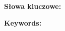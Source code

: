 {  \pracaStreszczenie\par
  \vspace{3mm}
  \noindent\textbf{Słowa kluczowe:} \pracaSlowaKluczowe\par
  \vspace{10mm}
  \begin{otherlanguage}{english}
  \vspace{2mm}
  \pracaAbstract\par
  \vspace{3mm}
  \noindent\textbf{Keywords:} \pracaKeywords\par
  \end{otherlanguage}
  \cleardoublepage
}
